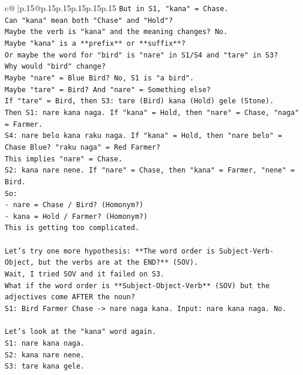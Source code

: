 \documentclass{article}
\begin{document}
{\begin{supertabular}{c@{$\;$}|p{.15\linewidth}@{}p{.15\linewidth}p{.15\linewidth}p{.15\linewidth}p{.15\linewidth}p{.15\linewidth}}
{{{\texttt{But in S1, "kana" = Chase.} \\
\texttt{Can "kana" mean both "Chase" and "Hold"?} \\
\texttt{Maybe the verb is "kana" and the meaning changes? No.} \\
\texttt{Maybe "kana" is a **prefix** or **suffix**?} \\
\texttt{Or maybe the word for "bird" is "nare" in S1/S4 and "tare" in S3?} \\
\texttt{Why would "bird" change?} \\
\texttt{Maybe "nare" = Blue Bird? No, S1 is "a bird".} \\
\texttt{Maybe "tare" = Bird? And "nare" = Something else?} \\
\texttt{If "tare" = Bird, then S3: tare (Bird) kana (Hold) gele (Stone).} \\
\texttt{Then S1: nare kana naga. If "kana" = Hold, then "nare" = Chase, "naga" = Farmer.} \\
\texttt{S4: nare belo kana raku naga. If "kana" = Hold, then "nare belo" = Chase Blue? "raku naga" = Red Farmer?} \\
\texttt{This implies "nare" = Chase.} \\
\texttt{S2: kana nare nene. If "nare" = Chase, then "kana" = Farmer, "nene" = Bird.} \\
\texttt{So:} \\
\texttt{{-} nare = Chase / Bird? (Homonym?)} \\
\texttt{{-} kana = Hold / Farmer? (Homonym?)} \\
\texttt{This is getting too complicated.} \\
\\ 
\texttt{Let's try one more hypothesis: **The word order is Subject{-}Verb{-}Object, but the verbs are at the END?** (SOV).} \\
\texttt{Wait, I tried SOV and it failed on S3.} \\
\texttt{What if the word order is **Subject{-}Object{-}Verb** (SOV) but the adjectives come AFTER the noun?} \\
\texttt{S1: Bird Farmer Chase {-}> nare naga kana. Input: nare kana naga. No.} \\
\\ 
\texttt{Let's look at the "kana" word again.} \\
\texttt{S1: nare kana naga.} \\
\texttt{S2: kana nare nene.} \\
\texttt{S3: tare kana gele.} \\
}}}
\end{supertabular}}
\end{document}
